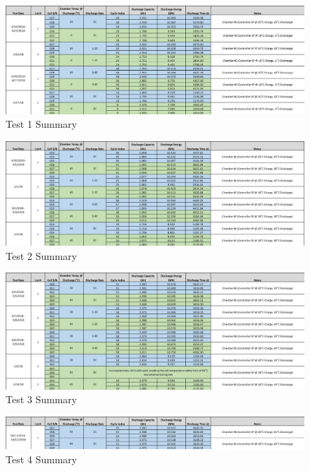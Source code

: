 \documentclass[]{aiaa-tc}%
\begin{document}
\begin{figure}[!htb]
	\centering
	\includegraphics[width=1.0\textwidth]{figures/Test1Summary.png}
	\caption{Test 1 Summary}
	\label{fig:Test1Summary}
\end{figure}

\begin{figure}[!htb]
	\centering
	\includegraphics[width=1.0\textwidth]{figures/Test2Summary.png}
	\caption{Test 2 Summary}
	\label{fig:Test2Summary}
\end{figure}

\begin{figure}[!htb]
	\centering
	\includegraphics[width=1.0\textwidth]{figures/Test3Summary.png}
	\caption{Test 3 Summary}
	\label{fig:Test3Summary}
\end{figure}

\begin{figure}[!htb]
	\centering
	\includegraphics[width=1.0\textwidth]{figures/Test4Summary.png}
	\caption{Test 4 Summary}
	\label{fig:Test4Summary}
\end{figure}
\end{document}
